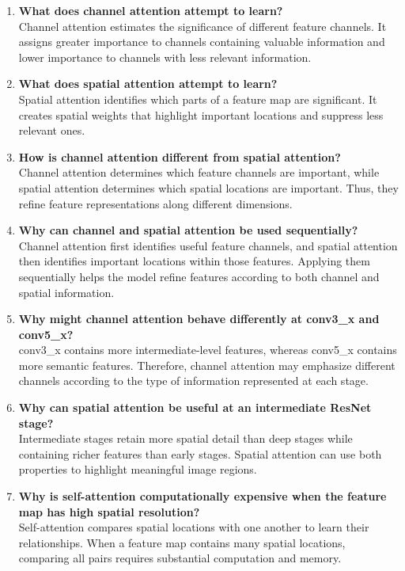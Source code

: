 \documentclass[10pt]{article}
\begin{document}
\begin{enumerate}
\item \textbf{What does channel attention attempt to learn?}\\
Channel attention estimates the significance of different feature channels. It assigns greater importance to channels containing valuable information and lower importance to channels with less relevant information.

\item \textbf{What does spatial attention attempt to learn?}\\
Spatial attention identifies which parts of a feature map are significant. It creates spatial weights that highlight important locations and suppress less relevant ones.

\item \textbf{How is channel attention different from spatial attention?}\\
Channel attention determines which feature channels are important, while spatial attention determines which spatial locations are important. Thus, they refine feature representations along different dimensions.

\item \textbf{Why can channel and spatial attention be used sequentially?}\\
Channel attention first identifies useful feature channels, and spatial attention then identifies important locations within those features. Applying them sequentially helps the model refine features according to both channel and spatial information.

\item \textbf{Why might channel attention behave differently at conv3\_x and conv5\_x?}\\
conv3\_x contains more intermediate-level features, whereas conv5\_x contains more semantic features. Therefore, channel attention may emphasize different channels according to the type of information represented at each stage.

\item \textbf{Why can spatial attention be useful at an intermediate ResNet stage?}\\
Intermediate stages retain more spatial detail than deep stages while containing richer features than early stages. Spatial attention can use both properties to highlight meaningful image regions.

\item \textbf{Why is self-attention computationally expensive when the feature map has high spatial resolution?}\\
Self-attention compares spatial locations with one another to learn their relationships. When a feature map contains many spatial locations, comparing all pairs requires substantial computation and memory.


\end{enumerate}
\end{document}
